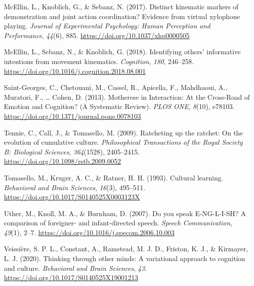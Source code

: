 \documentclass[
  man,floatsintext]{apa6}
\newlength{\cslhangindent}
\newlength{\cslentryspacingunit} %
\newenvironment{CSLReferences}[2] %
 {%
  \setlength{\parindent}{0pt}
  \ifodd #1
  \let\oldpar\par
  \def\par{\hangindent=\cslhangindent\oldpar}
  \fi
  \setlength{\parskip}{#2\cslentryspacingunit}
 }%
 {}
\begin{document}
\begin{CSLReferences}{1}{0}
\leavevmode{}%
McEllin, L., Knoblich, G., \& Sebanz, N. (2017). Distinct kinematic markers of demonstration and joint action coordination? {Evidence} from virtual xylophone playing. \emph{Journal of Experimental Psychology: Human Perception and Performance}, \emph{44}(6), 885. \url{https://doi.org/10.1037/xhp0000505}

\leavevmode{}%
McEllin, L., Sebanz, N., \& Knoblich, G. (2018). Identifying others' informative intentions from movement kinematics. \emph{Cognition}, \emph{180}, 246--258. \url{https://doi.org/10.1016/j.cognition.2018.08.001}

\leavevmode{}%
Saint-Georges, C., Chetouani, M., Cassel, R., Apicella, F., Mahdhaoui, A., Muratori, F., \ldots{} Cohen, D. (2013). Motherese in {Interaction}: {At} the {Cross-Road} of {Emotion} and {Cognition}? ({A Systematic Review}). \emph{PLOS ONE}, \emph{8}(10), e78103. \url{https://doi.org/10.1371/journal.pone.0078103}

\leavevmode{}%
Tennie, C., Call, J., \& Tomasello, M. (2009). Ratcheting up the ratchet: On the evolution of cumulative culture. \emph{Philosophical Transactions of the Royal Society B: Biological Sciences}, \emph{364}(1528), 2405--2415. \url{https://doi.org/10.1098/rstb.2009.0052}

\leavevmode{}%
Tomasello, M., Kruger, A. C., \& Ratner, H. H. (1993). Cultural learning. \emph{Behavioral and Brain Sciences}, \emph{16}(3), 495--511. \url{https://doi.org/10.1017/S0140525X0003123X}

\leavevmode{}%
Uther, M., Knoll, M. A., \& Burnham, D. (2007). Do you speak {E-NG-L-I-SH}? {A} comparison of foreigner- and infant-directed speech. \emph{Speech Communication}, \emph{49}(1), 2--7. \url{https://doi.org/10.1016/j.specom.2006.10.003}

\leavevmode{}%
Veissière, S. P. L., Constant, A., Ramstead, M. J. D., Friston, K. J., \& Kirmayer, L. J. (2020). Thinking through other minds: {A} variational approach to cognition and culture. \emph{Behavioral and Brain Sciences}, \emph{43}. \url{https://doi.org/10.1017/S0140525X19001213}

\end{CSLReferences}

\endgroup
\end{document}
